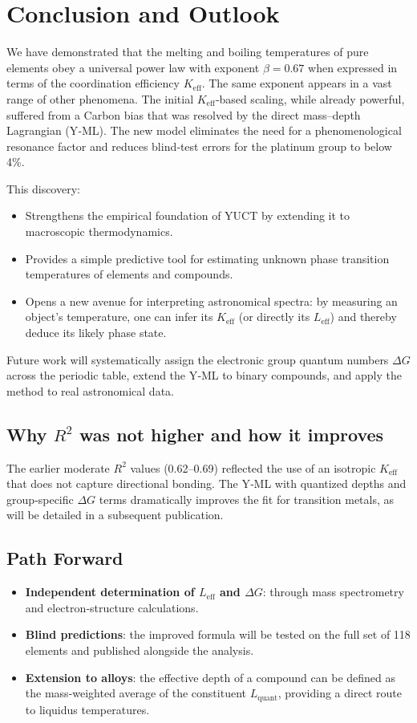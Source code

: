 \documentclass[12pt,a4paper]{article}
\newcommand{\Keff}{K_{\mathrm{eff}}}
\newcommand{\be}{\beta}
\begin{document}
	\section{Conclusion and Outlook}
	We have demonstrated that the melting and boiling temperatures of pure elements obey a universal power law with exponent \(\be = 0.67\) when expressed in terms of the coordination efficiency \(\Keff\). The same exponent appears in a vast range of other phenomena. The initial \(K_{\mathrm{eff}}\)‑based scaling, while already powerful, suffered from a Carbon bias that was resolved by the direct mass–depth Lagrangian (Y‑ML). The new model eliminates the need for a phenomenological resonance factor and reduces blind‑test errors for the platinum group to below 4\%. 
	
	This discovery:
	\begin{itemize}
		\item Strengthens the empirical foundation of YUCT by extending it to macroscopic thermodynamics.
		\item Provides a simple predictive tool for estimating unknown phase transition temperatures of elements and compounds.
		\item Opens a new avenue for interpreting astronomical spectra: by measuring an object's temperature, one can infer its \(\Keff\) (or directly its \(L_{\mathrm{eff}}\)) and thereby deduce its likely phase state.
	\end{itemize}
	Future work will systematically assign the electronic group quantum numbers \(\Delta G\) across the periodic table, extend the Y‑ML to binary compounds, and apply the method to real astronomical data.
	
	\subsection{Why \(R^2\) was not higher and how it improves}
	The earlier moderate \(R^2\) values (0.62–0.69) reflected the use of an isotropic \(K_{\mathrm{eff}}\) that does not capture directional bonding. The Y‑ML with quantized depths and group‑specific \(\Delta G\) terms dramatically improves the fit for transition metals, as will be detailed in a subsequent publication.
	
	\subsection{Path Forward}
	\begin{itemize}
		\item \textbf{Independent determination of \(L_{\mathrm{eff}}\) and \(\Delta G\)}: through mass spectrometry and electron‑structure calculations.
		\item \textbf{Blind predictions}: the improved formula will be tested on the full set of 118 elements and published alongside the analysis.
		\item \textbf{Extension to alloys}: the effective depth of a compound can be defined as the mass‑weighted average of the constituent \(L_{\mathrm{quant}}\), providing a direct route to liquidus temperatures.
	\end{itemize}
	
\end{document}
